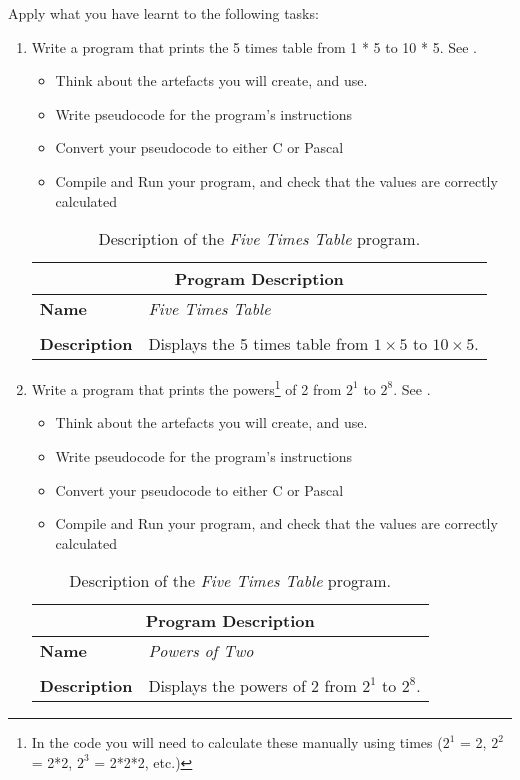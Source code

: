 Apply what you have learnt to the following tasks:

\begin{enumerate}
  \item Write a program that prints the 5 times table from 1 * 5 to 10 * 5. See .
  \begin{itemize}
    \item Think about the artefacts you will create, and use.
    \item Write pseudocode for the program's instructions
    \item Convert your pseudocode to either C or Pascal
    \item Compile and Run your program, and check that the values are correctly calculated
  \end{itemize}
  
  \begin{table}[h]
  \centering
  \begin{tabular}{l|p{12cm}}
    \hline
    \multicolumn{2}{c}{\textbf{Program Description}} \\
    \hline
    \textbf{Name} & \emph{Five Times Table} \\
    \\
    \textbf{Description} & Displays the 5 times table from $1 \times 5$ to $10 \times 5$. \\
    \hline
  \end{tabular}
  \caption{Description of the \emph{Five Times Table} program.}
  \label{tbl:five-times}
  \end{table}
  
  
  \item Write a program that prints the powers\footnote{In the code you will need to calculate these manually using times ($2^1$ = 2, $2^2$ = 2*2, $2^3$ = 2*2*2, etc.)} of 2 from $2^1$ to $2^8$. See .
  \begin{itemize}
    \item Think about the artefacts you will create, and use.
    \item Write pseudocode for the program's instructions
    \item Convert your pseudocode to either C or Pascal
    \item Compile and Run your program, and check that the values are correctly calculated
  \end{itemize}
  
  \begin{table}[h]
  \centering
  \begin{tabular}{l|p{12cm}}
    \hline
    \multicolumn{2}{c}{\textbf{Program Description}} \\
    \hline
    \textbf{Name} & \emph{Powers of Two} \\
    \\
    \textbf{Description} & Displays the powers of 2 from $2^{1}$ to $2^{8}$. \\
    \hline
  \end{tabular}
  \caption{Description of the \emph{Five Times Table} program.}
  \label{tbl:two-powers}
  \end{table}
  

\end{enumerate}
